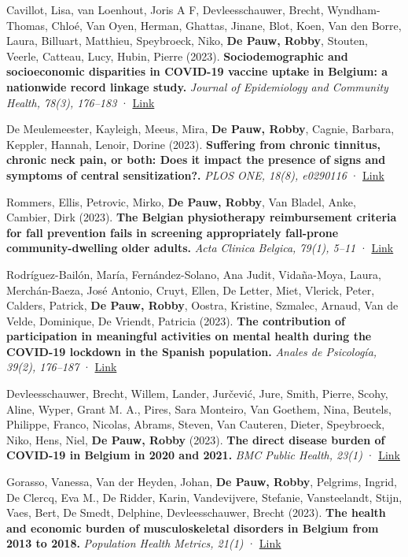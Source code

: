 \documentclass[
  letterpaper,
  DIV=11,
  numbers=noendperiod]{scrartcl}
\begin{document}
Cavillot, Lisa, van Loenhout, Joris A F, Devleesschauwer, Brecht,
Wyndham-Thomas, Chloé, Van Oyen, Herman, Ghattas, Jinane, Blot, Koen,
Van den Borre, Laura, Billuart, Matthieu, Speybroeck, Niko, \textbf{De
Pauw, Robby}, Stouten, Veerle, Catteau, Lucy, Hubin, Pierre (2023).
\textbf{Sociodemographic and socioeconomic disparities in COVID-19
vaccine uptake in Belgium: a nationwide record linkage study.}
\emph{Journal of Epidemiology and Community Health, 78(3), 176--183} ·
\href{http://dx.doi.org/10.1136/JECH-2023-220751}{Link}

De Meulemeester, Kayleigh, Meeus, Mira, \textbf{De Pauw, Robby}, Cagnie,
Barbara, Keppler, Hannah, Lenoir, Dorine (2023). \textbf{Suffering from
chronic tinnitus, chronic neck pain, or both: Does it impact the
presence of signs and symptoms of central sensitization?.} \emph{PLOS
ONE, 18(8), e0290116} ·
\href{http://dx.doi.org/10.1371/JOURNAL.PONE.0290116}{Link}

Rommers, Ellis, Petrovic, Mirko, \textbf{De Pauw, Robby}, Van Bladel,
Anke, Cambier, Dirk (2023). \textbf{The Belgian physiotherapy
reimbursement criteria for fall prevention fails in screening
appropriately fall-prone community-dwelling older adults.} \emph{Acta
Clinica Belgica, 79(1), 5--11} ·
\href{http://dx.doi.org/10.1080/17843286.2023.2268916}{Link}

Rodríguez-Bailón, María, Fernández-Solano, Ana Judit, Vidaña-Moya,
Laura, Merchán-Baeza, José Antonio, Cruyt, Ellen, De Letter, Miet,
Vlerick, Peter, Calders, Patrick, \textbf{De Pauw, Robby}, Oostra,
Kristine, Szmalec, Arnaud, Van de Velde, Dominique, De Vriendt, Patricia
(2023). \textbf{The contribution of participation in meaningful
activities on mental health during the COVID-19 lockdown in the Spanish
population.} \emph{Anales de Psicología, 39(2), 176--187} ·
\href{http://dx.doi.org/10.6018/ANALESPS.512291}{Link}

Devleesschauwer, Brecht, Willem, Lander, Jurčević, Jure, Smith, Pierre,
Scohy, Aline, Wyper, Grant M. A., Pires, Sara Monteiro, Van Goethem,
Nina, Beutels, Philippe, Franco, Nicolas, Abrams, Steven, Van Cauteren,
Dieter, Speybroeck, Niko, Hens, Niel, \textbf{De Pauw, Robby} (2023).
\textbf{The direct disease burden of COVID-19 in Belgium in 2020 and
2021.} \emph{BMC Public Health, 23(1)} ·
\href{http://dx.doi.org/10.1186/S12889-023-16572-0}{Link}

Gorasso, Vanessa, Van der Heyden, Johan, \textbf{De Pauw, Robby},
Pelgrims, Ingrid, De Clercq, Eva M., De Ridder, Karin, Vandevijvere,
Stefanie, Vansteelandt, Stijn, Vaes, Bert, De Smedt, Delphine,
Devleesschauwer, Brecht (2023). \textbf{The health and economic burden
of musculoskeletal disorders in Belgium from 2013 to 2018.}
\emph{Population Health Metrics, 21(1)} ·
\href{http://dx.doi.org/10.1186/S12963-023-00303-Z}{Link}
\end{document}
